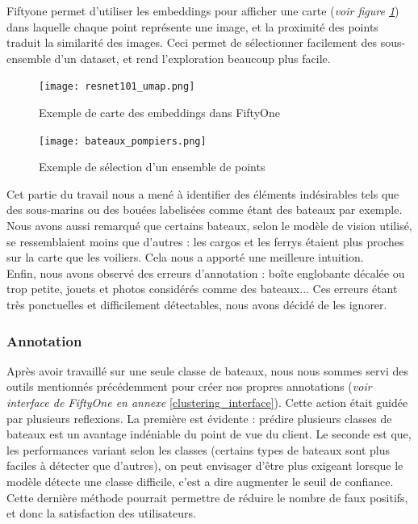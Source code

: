 Fiftyone permet d'utiliser les embeddings pour afficher une carte (\textit{voir figure \ref{carte_similarite}})
    dans laquelle chaque point représente 
une image, et la proximité des points traduit la similarité des images.
Ceci permet de sélectionner facilement des sous-ensemble d'un dataset, et rend l'exploration beaucoup
plus facile. 

\begin{figure}[H]
    \centering
    \texttt{[image: resnet101\_umap.png]}
    \caption{Exemple de carte des embeddings dans FiftyOne}\label{carte_similarite}
\end{figure}

\begin{figure}[H]
    \centering
    \texttt{[image: bateaux\_pompiers.png]}
    \caption{Exemple de sélection d'un ensemble de points}
\end{figure}

Cet partie du travail nous a mené à identifier des éléments indésirables tels que des sous-marins ou 
des bouées labelisées comme étant des bateaux par exemple. Nous avons aussi remarqué que certains bateaux,
selon le modèle de vision utilisé, se ressemblaient moins que d'autres : les cargos et les ferrys étaient 
plus proches sur la carte que les voiliers. Cela nous a apporté une meilleure intuition.\\

Enfin, nous avons observé des erreurs d'annotation : boîte englobante décalée ou trop petite, 
jouets et photos considérés comme des bateaux... Ces erreurs étant très ponctuelles et difficilement 
détectables, nous avons décidé de les ignorer.\\ 

\subsubsection{Annotation}

Après avoir travaillé sur une seule classe de bateaux, nous nous sommes servi des outils mentionnés précédemment 
pour créer nos propres annotations (\textit{voir interface de FiftyOne en annexe }\ref{clustering_interface}). 
Cette action était guidée par plusieurs reflexions. La première est évidente :
prédire plusieurs classes de bateaux est un avantage indéniable du point de vue du client. 
Le seconde est que, les performances variant selon les classes (certains types de bateaux sont plus faciles à 
détecter que d'autres), on peut envisager d'être plus exigeant lorsque le modèle détecte une classe difficile, 
c'est a dire augmenter le seuil de confiance. Cette dernière méthode pourrait permettre de réduire 
le nombre de faux positifs, et donc la satisfaction des utilisateurs.\\ 

